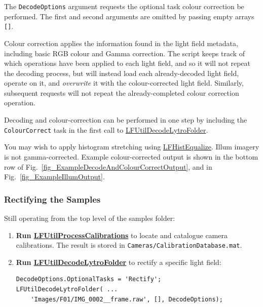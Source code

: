 \documentclass[onecolumn]{article}
\newcommand{\CiteFunc}[1]{\hyperlink{#1}{\small #1}}
\newcommand{\SymbolText}[1]{\texttt{\small #1}}
\begin{document}
\begin{enumerate}[leftmargin=1.5em,rightmargin=0.5cm]
The \SymbolText{DecodeOptions} argument requests the optional task colour correction be performed. The first and second arguments are omitted by passing empty arrays \SymbolText{[]}.

Colour correction applies the information found in the light field metadata, including basic RGB colour and Gamma correction. The script keeps track of which operations have been applied to each light field, and so it will not repeat the decoding process, but will instead load each already-decoded light field, operate on it, and \emph{overwrite} it with the colour-corrected light field. Similarly, subsequent requests will not repeat the already-completed colour correction operation.

Decoding and colour-correction can be performed in one step by including the \SymbolText{ColourCorrect} task in the first call to \CiteFunc{LFUtilDecodeLytroFolder}.

You may wish to apply histogram stretching using \CiteFunc{LFHistEqualize}. Illum imagery is not gamma-corrected.  Example colour-corrected output is shown in the bottom row of Fig.~\ref{fig_ExampleDecodeAndColourCorrectOutput}, and in Fig.~\ref{fig_ExampleIllumOutput}.
\end{enumerate}

\subsubsection{Rectifying the Samples}

Still operating from the top level of the samples folder:
\begin{enumerate}[leftmargin=1.5em,rightmargin=0.5cm]
\item \textbf{Run \CiteFunc{LFUtilProcessCalibrations}} to locate and catalogue camera calibrations. The result is stored in \SymbolText{Cameras/CalibrationDatabase.mat}.
\item \textbf{Run \CiteFunc{LFUtilDecodeLytroFolder}} to rectify a specific light field:
\begin{Verbatim}
DecodeOptions.OptionalTasks = 'Rectify';
LFUtilDecodeLytroFolder( ...
    'Images/F01/IMG_0002__frame.raw', [], DecodeOptions);
\end{Verbatim}
\end{enumerate}
\end{document}
